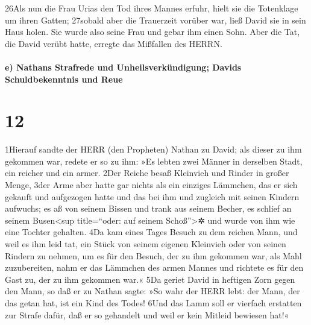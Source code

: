 26Als nun die Frau Urias den Tod ihres Mannes erfuhr, hielt sie die
Totenklage um ihren Gatten; 27sobald aber die Trauerzeit vorüber war,
ließ David sie in sein Haus holen. Sie wurde also seine Frau und gebar
ihm einen Sohn. Aber die Tat, die David verübt hatte, erregte das
Mißfallen des HERRN.

\hypertarget{e-nathans-strafrede-und-unheilsverkuxfcndigung-davids-schuldbekenntnis-und-reue}{%
\paragraph{e) Nathans Strafrede und Unheilsverkündigung; Davids
Schuldbekenntnis und
Reue}\label{e-nathans-strafrede-und-unheilsverkuxfcndigung-davids-schuldbekenntnis-und-reue}}

\hypertarget{section-11}{%
\section{12}\label{section-11}}

1Hierauf sandte der HERR (den Propheten) Nathan zu David; als dieser zu
ihm gekommen war, redete er so zu ihm: »Es lebten zwei Männer in
derselben Stadt, ein reicher und ein armer. 2Der Reiche besaß Kleinvieh
und Rinder in großer Menge, 3der Arme aber hatte gar nichts als ein
einziges Lämmchen, das er sich gekauft und aufgezogen hatte und das bei
ihm und zugleich mit seinen Kindern aufwuchs; es aß von seinem Bissen
und trank aus seinem Becher, es schlief an seinem Busen\textless sup
title=``oder: auf seinem Schoß''\textgreater✲ und wurde von ihm wie eine
Tochter gehalten. 4Da kam eines Tages Besuch zu dem reichen Mann, und
weil es ihm leid tat, ein Stück von seinem eigenen Kleinvieh oder von
seinen Rindern zu nehmen, um es für den Besuch, der zu ihm gekommen war,
als Mahl zuzubereiten, nahm er das Lämmchen des armen Mannes und
richtete es für den Gast zu, der zu ihm gekommen war.« 5Da geriet David
in heftigen Zorn gegen den Mann, so daß er zu Nathan sagte: »So wahr der
HERR lebt: der Mann, der das getan hat, ist ein Kind des Todes! 6Und das
Lamm soll er vierfach erstatten zur Strafe dafür, daß er so gehandelt
und weil er kein Mitleid bewiesen hat!«

